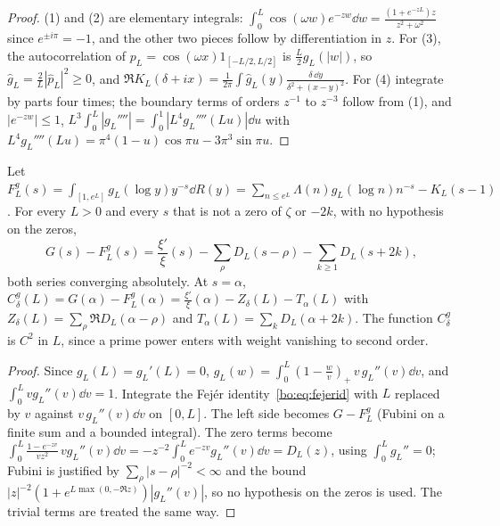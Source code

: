 \begin{proof}
(1) and (2) are elementary integrals: $\int_0^L\cos(\omega w)e^{-zw}\dd w=\frac{(1+e^{-zL})z}{z^2+\omega^2}$ since $e^{\pm i\pi}=-1$, and the other two pieces follow by differentiation in $z$. For (3), the autocorrelation of $p_L=\cos(\omega x)1_{[-L/2,L/2]}$ is $\frac L2g_L(|w|)$, so $\hat g_L=\frac2L|\hat p_L|^2\ge0$, and $\Re K_L(\delta+ix)=\frac1{2\pi}\int\hat g_L(y)\frac{\delta\,\dd y}{\delta^2+(x-y)^2}$. For (4) integrate by parts four times; the boundary terms of orders $z^{-1}$ to $z^{-3}$ follow from (1), and $|e^{-zw}|\le1$, $L^3\int_0^L|g_L''''|=\int_0^1|L^4g_L''''(Lu)|\dd u$ with $L^4g_L''''(Lu)=\pi^4(1-u)\cos\pi u-3\pi^3\sin\pi u$.
\end{proof}

\begin{proposition}\label{bo:prop:smoothid}
Let $F^g_L(s)=\int_{[1,e^L]}g_L(\log y)y^{-s}\dd R(y)=\sum_{n\le e^L}\Lambda(n)g_L(\log n)n^{-s}-K_L(s-1)$. For every $L>0$ and every $s$ that is not a zero of $\zeta$ or $-2k$, with no hypothesis on the zeros,
\[
G(s)-F^g_L(s)=\frac{\xi'}{\xi}(s)-\sum_\rho D_L(s-\rho)-\sum_{k\ge1}D_L(s+2k),
\]
both series converging absolutely. At $s=\alpha$, $C^g_\delta(L)=G(\alpha)-F^g_L(\alpha)=\frac{\xi'}{\xi}(\alpha)-Z_\delta(L)-T_\alpha(L)$ with $Z_\delta(L)=\sum_\rho\Re D_L(\alpha-\rho)$ and $T_\alpha(L)=\sum_kD_L(\alpha+2k)$. The function $C^g_\delta$ is $C^2$ in $L$, since a prime power enters with weight vanishing to second order.
\end{proposition}

\begin{proof}
Since $g_L(L)=g_L'(L)=0$, $g_L(w)=\int_0^L(1-\frac wv)_+\,v\,g_L''(v)\dd v$, and $\int_0^Lvg_L''(v)\dd v=1$. Integrate the Fej\'er identity~\eqref{bo:eq:fejerid} with $L$ replaced by $v$ against $v\,g_L''(v)\dd v$ on $[0,L]$. The left side becomes $G-F^g_L$ (Fubini on a finite sum and a bounded integral). The zero terms become $\int_0^L\frac{1-e^{-zv}}{vz^2}\,vg_L''(v)\dd v=-z^{-2}\int_0^Le^{-zv}g_L''(v)\dd v=D_L(z)$, using $\int_0^Lg_L''=0$; Fubini is justified by $\sum_\rho|s-\rho|^{-2}<\infty$ and the bound $|z|^{-2}(1+e^{L\max(0,-\Re z)})|g_L''(v)|$, so no hypothesis on the zeros is used. The trivial terms are treated the same way.
\end{proof}

